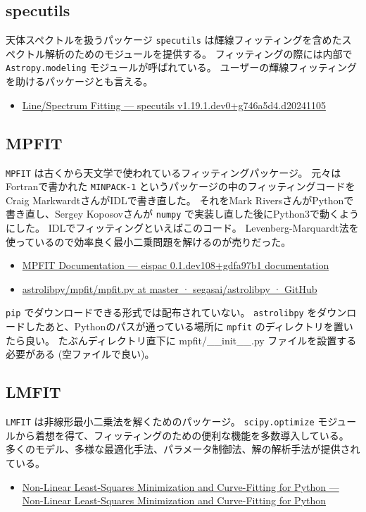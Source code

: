 \documentclass[a4paper, 9pt, notitlepage, uplatex, dvipdfmx]{jsarticle}
\begin{document}
\subsection{specutils}
\label{sec:orge76c49a}
天体スペクトルを扱うパッケージ \texttt{specutils} は輝線フィッティングを含めたスペクトル解析のためのモジュールを提供する。
フィッティングの際には内部で \texttt{Astropy.modeling} モジュールが呼ばれている。
ユーザーの輝線フィッティングを助けるパッケージとも言える。
\begin{itemize}
\item \href{https://specutils.readthedocs.io/en/stable/fitting.html}{Line/Spectrum Fitting — specutils v1.19.1.dev0+g746a5d4.d20241105}
\end{itemize}
\subsection{MPFIT}
\label{sec:orgc7e6f33}
\texttt{MPFIT} は古くから天文学で使われているフィッティングパッケージ。
元々はFortranで書かれた \texttt{MINPACK-1} というパッケージの中のフィッティングコードをCraig MarkwardtさんがIDLで書き直した。
それをMark RiversさんがPythonで書き直し、Sergey Koposovさんが \texttt{numpy} で実装し直した後にPython3で動くようにした。
IDLでフィッティングといえばこのコード。
Levenberg-Marquardt法を使っているので効率良く最小二乗問題を解けるのが売りだった。
\begin{itemize}
\item \href{https://eispac.readthedocs.io/en/stable/guide/07-mpfit\_docs.html}{MPFIT Documentation — eispac 0.1.dev108+gdfa97b1 documentation}
\item \href{https://github.com/segasai/astrolibpy/blob/master/mpfit/mpfit.py}{astrolibpy/mpfit/mpfit.py at master · segasai/astrolibpy · GitHub}
\end{itemize}

\texttt{pip} でダウンロードできる形式では配布されていない。
\texttt{astrolibpy} をダウンロードしたあと、Pythonのパスが通っている場所に \texttt{mpfit} のディレクトリを置いたら良い。
たぶんディレクトリ直下に mpfit/\_\_init\_\_.py ファイルを設置する必要がある (空ファイルで良い)。
\subsection{LMFIT}
\label{sec:orgb836d51}
\texttt{LMFIT} は非線形最小二乗法を解くためのパッケージ。
\texttt{scipy.optimize} モジュールから着想を得て、フィッティングのための便利な機能を多数導入している。
多くのモデル、多様な最適化手法、パラメータ制御法、解の解析手法が提供されている。
\begin{itemize}
\item \href{https://lmfit.github.io/lmfit-py/index.html}{Non-Linear Least-Squares Minimization and Curve-Fitting for Python — Non-Linear Least-Squares Minimization and Curve-Fitting for Python}
\end{itemize}
\end{document}
